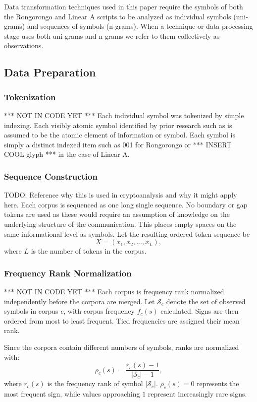 \documentclass[preprint,12pt]{elsarticle}
\begin{document}
Data transformation techniques used in this paper require the symbols of both the Rongorongo and Linear A scripts to be analyzed as individual symbols (uni-grams) and sequences of symbols (n-grams). When a technique or data processing stage uses both uni-grams and n-grams we refer to them collectively as observations.

\subsection{Data Preparation}
\subsubsection{Tokenization} *** NOT IN CODE YET ***
Each individual symbol was tokenized by simple indexing. Each visibly atomic symbol identified by prior research such as \cite{} \cite{} \cite{} is assumed to be the atomic element of information or symbol. Each symbol is simply a distinct indexed item such as 001 for Rongorongo or *** INSERT COOL glyph *** in the case of Linear A. 

\subsubsection{Sequence Construction}
TODO: Reference why this is used in cryptoanalysis and why it might apply here. 
Each corpus is sequenced as one long single sequence. No boundary or gap tokens are used as these would require an assumption of knowledge on the underlying structure of the communication. This places empty spaces on the same informational level as symbols.
Let the resulting ordered token sequence be
\[
X = (x_1,x_2,\ldots,x_L),
\]where \(L\) is the number of tokens in the corpus.

\subsubsection{Frequency Rank Normalization} *** NOT IN CODE YET ***
Each corpus is frequency rank normalized independently before the corpora are merged. Let \(\mathcal{S}_c\) denote the set of observed symbols in corpus \(c\), with corpus frequency \(f_c(s)\) calculated. Signs are then ordered from most to least frequent. Tied frequencies are assigned their mean rank.

Since the corpora contain different numbers of symbols, ranks are normalized with:
\[
\rho_c(s)=\frac{r_c(s)-1}{|\mathcal{S}_c|-1},
\]
where \(r_c(s)\) is the frequency rank of 
symbol \(\left|\mathcal{S}_c\right|\). \(\rho_c(s)=0\) represents the most frequent sign, while values approaching \(1\) represent increasingly rare signs.
\end{document}
